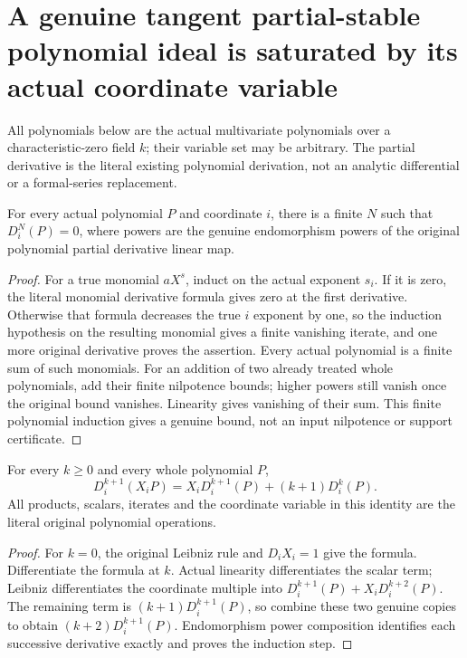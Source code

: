 \section{A genuine tangent partial-stable polynomial ideal is saturated by its actual coordinate variable}

All polynomials below are the actual multivariate polynomials over a
characteristic-zero field $k$; their variable set may be arbitrary.
The partial derivative is the literal existing polynomial derivation,
not an analytic differential or a formal-series replacement.

\begin{theorem}
\label{hir:actual-polynomial-pderiv-locally-nilpotent}
\leanok
For every actual polynomial $P$ and coordinate $i$, there is a finite
$N$ such that $D_i^N(P)=0$, where powers are the genuine endomorphism
powers of the original polynomial partial derivative linear map.
\end{theorem}
\begin{proof}
For a true monomial $aX^s$, induct on the actual exponent $s_i$.
If it is zero, the literal monomial derivative formula gives zero
at the first derivative. Otherwise that formula decreases the true
$i$ exponent by one, so the induction hypothesis on the resulting
monomial gives a finite vanishing iterate, and one more original
derivative proves the assertion. Every actual polynomial is a finite
sum of such monomials. For an addition of two already treated whole
polynomials, add their finite nilpotence bounds; higher powers still
vanish once the original bound vanishes. Linearity gives vanishing
of their sum. This finite polynomial induction gives a genuine
bound, not an input nilpotence or support certificate.
\end{proof}

\begin{theorem}
\label{hir:actual-polynomial-pderiv-coordinate-multiple-iterate}
\leanok
For every $k\ge0$ and every whole polynomial $P$,
\[
 D_i^{k+1}(X_iP)=X_iD_i^{k+1}(P)+(k+1)D_i^k(P).
\]
All products, scalars, iterates and the coordinate variable in this
identity are the literal original polynomial operations.
\end{theorem}
\begin{proof}
For $k=0$, the original Leibniz rule and $D_iX_i=1$ give the formula.
Differentiate the formula at $k$. Actual linearity differentiates
the scalar term; Leibniz differentiates the coordinate multiple into
$D_i^{k+1}(P)+X_iD_i^{k+2}(P)$. The remaining term is
$(k+1)D_i^{k+1}(P)$, so combine these two genuine copies to obtain
$(k+2)D_i^{k+1}(P)$. Endomorphism power composition identifies each
successive derivative exactly and proves the induction step.
\end{proof}

